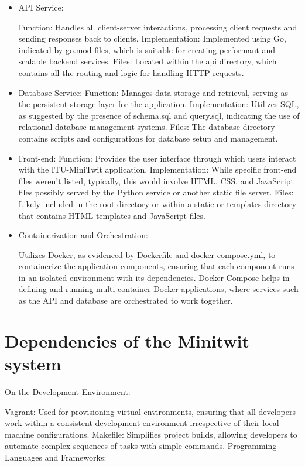 \documentclass[12pt, a4paper, oneside]{book}
\begin{document}
\begin{spacing}{1.5}
\begin{itemize}

\item API Service:

    \subitem Function: Handles all client-server interactions, processing client requests and sending responses back to clients.
    \subitem Implementation: Implemented using Go, indicated by go.mod files, which is suitable for creating performant and scalable backend services.
    \subitem Files: Located within the api directory, which contains all the routing and logic for handling HTTP requests.
\item Database Service:
    \subitem Function: Manages data storage and retrieval, serving as the persistent storage layer for the application.
    \subitem Implementation: Utilizes SQL, as suggested by the presence of schema.sql and query.sql, indicating the use of relational database management systems.
    \subitem Files: The database directory contains scripts and configurations for database setup and management.
\item Front-end:
    \subitem Function: Provides the user interface through which users interact with the ITU-MiniTwit application.
    \subitem Implementation: While specific front-end files weren't listed, typically, this would involve HTML, CSS, and JavaScript files possibly served by the Python service or another static file server.
    \subitem Files: Likely included in the root directory or within a static or templates directory that contains HTML templates and JavaScript files.
\item Containerization and Orchestration:

    \subitem Utilizes Docker, as evidenced by Dockerfile and docker-compose.yml, to containerize the application components, ensuring that each component runs in an isolated environment with its dependencies.
    \subitem Docker Compose helps in defining and running multi-container Docker applications, where services such as the API and database are orchestrated to work together.
\end{itemize}


\section{Dependencies of the Minitwit system}

On the Development Environment:

Vagrant: Used for provisioning virtual environments, ensuring that all developers work within a consistent development environment irrespective of their local machine configurations.
Makefile: Simplifies project builds, allowing developers to automate complex sequences of tasks with simple commands.
Programming Languages and Frameworks:


\end{spacing}
\end{document}
